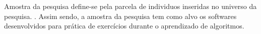 Amostra da pesquisa define-se pela parcela de individuos inseridas no universo da pesquisa. \cite{prodanov2013etal}. Assim sendo, a amostra da pesquisa tem como alvo os softwares desenvolvidos para prática de exercícios durante o aprendizado de algoritmos.\color{black}

\ifdraft{}{
%
%
%
%
%
%
}
